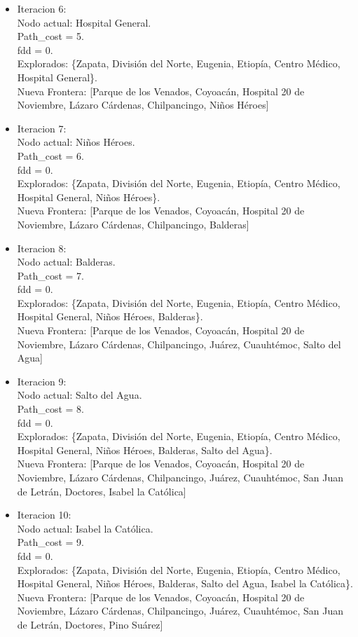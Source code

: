 \documentclass[10pt,a4paper]{article}
\begin{document}
\begin{itemize}
    \item Iteracion 6:\\
    Nodo actual: Hospital General.\\
    Path\_cost = 5.\\
    fdd = 0.\\
    Explorados: \{Zapata, División del Norte, Eugenia, Etiopía, Centro Médico, Hospital General\}.\\
    Nueva Frontera: [Parque de los Venados, Coyoacán, Hospital 20 de Noviembre, Lázaro Cárdenas, Chilpancingo, Niños Héroes]

    \item Iteracion 7:\\
    Nodo actual: Niños Héroes.\\
    Path\_cost = 6.\\
    fdd = 0.\\
    Explorados: \{Zapata, División del Norte, Eugenia, Etiopía, Centro Médico, Hospital General, Niños Héroes\}.\\
    Nueva Frontera: [Parque de los Venados, Coyoacán, Hospital 20 de Noviembre, Lázaro Cárdenas, Chilpancingo, Balderas]

    \item Iteracion 8:\\
    Nodo actual: Balderas.\\
    Path\_cost = 7.\\
    fdd = 0.\\
    Explorados: \{Zapata, División del Norte, Eugenia, Etiopía, Centro Médico, Hospital General, Niños Héroes, Balderas\}.\\
    Nueva Frontera: [Parque de los Venados, Coyoacán, Hospital 20 de Noviembre, Lázaro Cárdenas, Chilpancingo, Juárez, Cuauhtémoc, Salto del Agua]

    \item Iteracion 9:\\
    Nodo actual: Salto del Agua.\\
    Path\_cost = 8.\\
    fdd = 0.\\
    Explorados: \{Zapata, División del Norte, Eugenia, Etiopía, Centro Médico, Hospital General, Niños Héroes, Balderas, Salto del Agua\}.\\
    Nueva Frontera: [Parque de los Venados, Coyoacán, Hospital 20 de Noviembre, Lázaro Cárdenas, Chilpancingo, Juárez, Cuauhtémoc, San Juan de Letrán, Doctores, Isabel la Católica]

    \item Iteracion 10:\\
    Nodo actual: Isabel la Católica.\\
    Path\_cost = 9.\\
    fdd = 0.\\
    Explorados: \{Zapata, División del Norte, Eugenia, Etiopía, Centro Médico, Hospital General, Niños Héroes, Balderas, Salto del Agua, Isabel la Católica\}.\\
    Nueva Frontera: [Parque de los Venados, Coyoacán, Hospital 20 de Noviembre, Lázaro Cárdenas, Chilpancingo, Juárez, Cuauhtémoc, San Juan de Letrán, Doctores, Pino Suárez]


\end{itemize}
\end{document}
